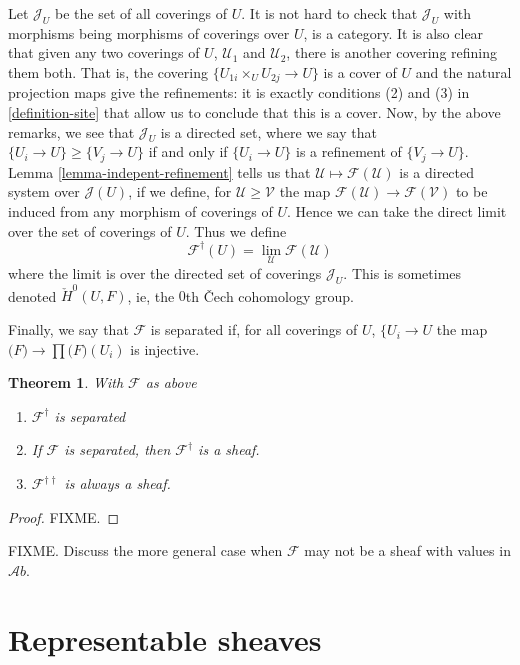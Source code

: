 \documentclass{amsart}
\newtheorem{theorem}{Theorem}[subsection]
\theoremstyle{definition}
\theoremstyle{remark}
\numberwithin{equation}{subsection}
\begin{document}
\noindent
Let $\mathcal{J}_U$ be the set of all coverings of $U$. It is not hard to
check that $\mathcal{J}_U$ with morphisms being morphisms of coverings
over $U$, is a category. It is also clear that given any two coverings of $U$,
$\mathcal{U}_1$ and $\mathcal{U}_2$, there is another covering refining them
both. That is, the covering $\{U_{1i} \times_U U_{2j} \rightarrow U\}$ is a
cover of $U$ and the natural projection maps give the refinements: it is
exactly conditions (2) and (3) in \ref{definition-site} that allow us to conclude
that this is a cover. Now, by the above remarks, we see that $\mathcal{J}_U$
is a directed set, where we say that $\{U_i \to U\} \geq \{V_j \to U\}$ if 
and only if $\{U_i \to U\}$ is a refinement of $\{V_j \to U\}$. Lemma
\ref{lemma-indepent-refinement} tells us that $\mathcal{U} \mapsto
\mathcal{F}(\mathcal{U})$ is a directed system over $\mathcal{J}(U)$, if
we define, for $\mathcal{U} \geq \mathcal{V}$ the map 
$\mathcal{F}(\mathcal{U}) \to \mathcal{F}(\mathcal{V})$ to be induced from any
morphism of coverings of $U$. Hence we can take the direct limit over the set
of coverings of $U$. Thus we define 
$$
\mathcal{F}^\dagger(U) = \lim_{\mathcal{U}}\mathcal{F}(\mathcal{U})
$$
where the limit is over the directed set of coverings $\mathcal{J}_U$.
This is sometimes denoted $\check{H}^0(U, F)$, ie, the $0$th \v{C}ech
cohomology group. 

\smallskip\noindent
Finally, we say that $\mathcal{F}$ is separated if, for all coverings
of $U$, $\{U_i \rightarrow U$ the map 
$\mathcal(F) \rightarrow \prod \mathcal(F)(U_i)$ is injective.

\begin{theorem}
With $\mathcal{F}$ as above
\begin{enumerate}
\item $\mathcal{F}^\dagger$ is separated
\item If $\mathcal{F}$ is separated, then $\mathcal{F}^\dagger$ is a sheaf.
\item $\mathcal{F}^{\dagger\dagger}$ is always a sheaf.
\end{enumerate}
\end{theorem}

\begin{proof}
FIXME.
\end{proof}

\noindent
FIXME. Discuss the more general case when $\mathcal{F}$ may not be a sheaf with
values in $\mathcal{A}b$.

\section{Representable sheaves}
\label{section-representable-sheaves}
\end{document}
